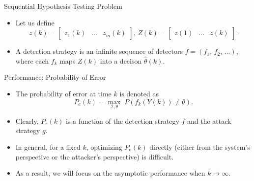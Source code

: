 \documentclass[10pt]{beamer}
\begin{document}
\begin{frame}{Sequential Hypothesis Testing Problem}
  \begin{itemize}
    \item Let us define 
      \begin{displaymath}
	z(k) = \begin{bmatrix}z_1(k)&\dots&z_m(k)\end{bmatrix},\,Z(k) = \begin{bmatrix}z(1)&\dots&z(k)\end{bmatrix}.
      \end{displaymath}
    \item A detection strategy is an infinite sequence of detectors $f = (f_1,\,f_2,\,\dots)$, where each $f_k$ maps $Z(k)$ into a decison $\hat \theta(k)$.
    \end{itemize}
  \end{frame}


\begin{frame}{Performance: Probability of Error}
  \begin{itemize}
  \item The probability of error at time $k$ is denoted as
    \begin{displaymath}
      P_e(k) = \max_{\mathcal I,\theta}\; P(f_k(Y(k)) \neq \theta). 
    \end{displaymath}
  \item Clearly, $P_e(k)$ is a function of the detection strategy $f$ and the attack strategy $g$.
  \item  In general, for a fixed $k$, optimizing $P_e(k)$ directly (either from the system's perspective or the attacker's perspective) is difficult.
  \item As a result, we will focus on the asymptotic performance when $k\rightarrow\infty$.
  \end{itemize}
\end{frame}
\end{document}
